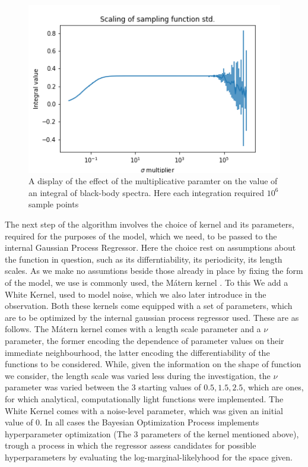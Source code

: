 \documentclass[12pt]{article}
\begin{document}
    \begin{figure}[H]
        \centering
        \includegraphics[width=\textwidth]{Integral.png}
        \caption{A display of the effect of the multiplicative paramter on the
        value of an integral of black-body spectra. Here each integration required $10^6$ sample points}
    \end{figure}

    The next step of the algorithm involves the choice of kernel and its parameters, required for
    the purposes of the model, which we need, to be passed to the internal Gaussian Process Regressor.
    Here the choice rest on assumptions about the function in question, such as its differntiability,
    its periodicity, its length scales. As we make no assumtions beside those already in place
    by fixing the form of the model, we use is commonly used, the Mátern kernel \cite{bo}. To this We
    add a White Kernel, used to model noise, which we also later introduce in the observation. Both 
    these kernels come equipped with a set of parameters, which are to be optimized by the internal
    gaussian process regressor used. These are as follows. The Mátern kernel comes with a length scale
    parameter and a $\nu$ parameter, the former encoding the dependence of parameter values 
    on their immediate neighbourhood, the latter encoding the differentiability of the functions to be 
    considered. While, given the information on the shape of function we consider, the length scale 
    was varied less during the investigation, the $\nu$ parameter was varied between the 3 
    starting values of $0.5, 1.5, 2.5$, which are ones, for which analytical, computationally light functions
    were implemented. The White Kernel comes with a noise-level parameter, which was given 
    an initial value of $0$. In all cases the Bayesian Optimization Process implements 
    hyperparameter optimization (The 3 parameters of the kernel mentioned above), trough a process in which
    the regressor assess candidates for possible hyperparameters by evaluating the log-marginal-likelyhood
    for the space given.
\end{document}
